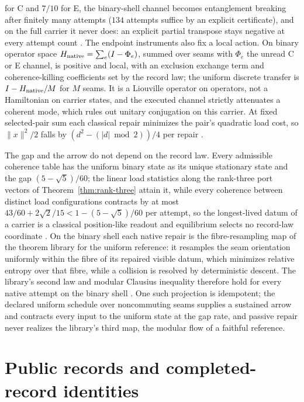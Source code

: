 \documentclass[11pt]{article}
\theoremstyle{definition}
\theoremstyle{remark}
\begin{document}
for C and $7/10$ for E, the binary-shell channel becomes entanglement breaking
after finitely many attempts ($134$ attempts suffice by an explicit
certificate), and on the full carrier it never does: an explicit partial
transpose stays negative at every attempt count \cite{ophmodel,ophmixing}.
The endpoint instruments also fix a local action. On binary operator space
$H_{\rm native}=\sum_e(I-\Phi_e)$, summed over seams with $\Phi_e$ the
unread C or E channel, is positive and local, with an exclusion exchange term
and coherence-killing coefficients set by the record law; the uniform
discrete transfer is $I-H_{\rm native}/M$ for $M$ seams. It is a Liouville
operator on operators, not a Hamiltonian on carrier states, and the executed
channel strictly attenuates a coherent mode, which rules out unitary
conjugation on this carrier. At fixed selected-pair sum each classical repair
minimizes the pair's quadratic load cost, so $\|x\|^2/2$ falls by
$(d^2-(|d|\bmod2))/4$ per repair \cite{ophnativeaction,ophmodel}.

The gap and the arrow do not depend on the record law. Every admissible
coherence table has the uniform binary state as its unique stationary state
and the gap $(5-\sqrt5)/60$; the linear load statistics along the rank-three
port vectors of Theorem~\ref{thm:rank-three} attain it, while every coherence
between distinct load configurations contracts by at most
$43/60+2\sqrt2/15<1-(5-\sqrt5)/60$ per attempt, so the longest-lived datum of
a carrier is a classical position-like readout and equilibrium selects no
record-law coordinate \cite{ophrecordlaws}. On the binary shell each native
repair is the fibre-resampling map of the theorem library for the uniform
reference: it resamples the seam orientation uniformly within the fibre of
its repaired visible datum, which minimizes relative entropy over that
fibre, while a collision is resolved by deterministic descent. The
library's second law and modular Clausius inequality therefore hold for
every native attempt on the binary shell \cite{ophobservers}. One such
projection is idempotent; the declared uniform schedule over noncommuting
seams supplies a sustained arrow and contracts every input to the uniform
state at the gap rate, and passive repair never realizes the library's third
map, the modular flow of a faithful reference.

\section{Public records and completed-record identities}
\label{sec:consensus}
\end{document}
